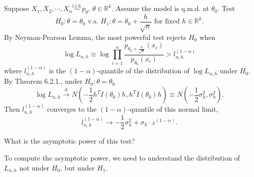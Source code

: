 \documentclass[a4paper]{article}
\begin{document}
\begin{eg}
	Suppose $X_1,X_2,\cdots,X_n \stackrel{\text{i.i.d.}}{\sim} p_{\theta}$, $\theta \in \mathbb{R}^k$. Assume the model is q.m.d. at $\theta_0$. Test
	\begin{equation*}
		H_0: \theta = \theta_0 \text{ v.s. } H_1: \theta = \theta_0 + \frac{h}{\sqrt{n}} \text{ for fixed $h \in \mathbb{R}^k$}.
	\end{equation*}
	By Neyman-Pearson Lemma, the most powerful test rejects $H_0$ when
	\begin{equation*}
		\log L_{n,h} \equiv \log \prod_{i=1}^n \frac{p_{\theta_0 + \frac{h}{\sqrt{n}}}(x_i)}{p_{\theta_0}(x_i)} > l_{n,h}^{(1-\alpha)}
	\end{equation*}
	where $l_{n,h}^{(1-\alpha)}$ is the $(1-\alpha)$-quantile of the distribution of $\log L_{n,h}$ under $H_0$.\\
	By Theorem 6.2.1., under $H_0: \theta = \theta_0$
	\begin{equation*}
		\log L_{n,h} \stackrel{\text{d}}{\longrightarrow} N\left(- \frac{1}{2} h^T I(\theta_0) h, h^T I(\theta_0) h\right) \equiv N\left(- \frac{1}{2} \sigma_h^2, \sigma_h^2\right).
	\end{equation*}
	Then $l_{n,h}^{(1-\alpha)}$ converges to the $(1-\alpha)$-quantile of this normal limit,
	\begin{equation*}
		l_{n,h}^{(1-\alpha)} \to - \frac{1}{2} \sigma_h^2 + \sigma_h \cdot z^{(1-\alpha)}.
	\end{equation*}
	\begin{question}
		What is the asymptotic power of this test?
	\end{question}
	\begin{answer}
		To compute the asymptotic power, we need to understand the distribution of $L_{n,h}$ not under $H_0$, but under $H_1$.
	\end{answer}


\end{eg}
\end{document}
